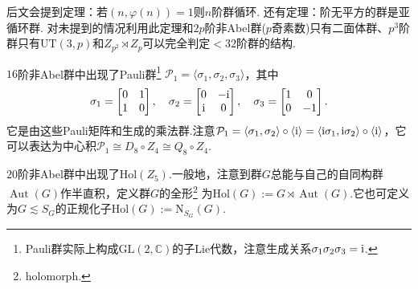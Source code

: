 \begin{remark}
	后文会提到定理：若$(n,\varphi(n))=1$则$n$阶群循环.%
	还有定理：阶无平方的群是亚循环群.%
	对未提到的情况利用此定理和$2p$阶非Abel群($p$奇素数)只有二面体群、$p^3$阶群只有$\mathrm{UT}(3,p)$和$Z_{p^2}\rtimes Z_p$可以完全判定$<32$阶群的结构.
\end{remark}
\begin{remark}
	$16$阶非Abel群中出现了{\heiti Pauli群}\footnote{Pauli群实际上构成$\mathrm{GL}(2,\mathbb{C})$的子Lie代数，注意生成关系$\sigma_1\sigma_2\sigma_3=\mathrm{i}$.} $\mathcal{P}_1=\langle \sigma_1,\sigma_2,\sigma_3\rangle $，其中
	\[
		\sigma_1=\begin{bmatrix}
			0&1\\
			1&0
		\end{bmatrix},\quad\sigma_2=\begin{bmatrix}
			0&-\mathrm{i}\\
			\mathrm{i}&0
		\end{bmatrix},\quad\sigma_3=\begin{bmatrix}
			1&0\\
			0&-1
		\end{bmatrix}.
	\]
	它是由这些Pauli矩阵和生成的乘法群.注意$\mathcal{P}_1=\langle \sigma_1,\sigma_2\rangle \circ\langle \mathrm{i}\rangle=\langle \mathrm{i}\sigma_1,\mathrm{i}\sigma_2\rangle \circ\langle \mathrm{i}\rangle  $，它可以表达为中心积$\mathcal{P}_1\cong D_8\circ Z_4\cong Q_8\circ Z_4$.
\end{remark}
\begin{remark}
	$20$阶非Abel群中出现了$\mathrm{Hol}(Z_5)$.一般地，注意到群$G$总能与自己的自同构群$\operatorname*{Aut}(G)$作半直积，定义群$G$的{\heiti 全形}\footnote{holomorph.} 为$\mathrm{Hol}(G):=G\rtimes\operatorname*{Aut}(G)$.它也可定义为$G\lesssim S_G$的正规化子$\mathrm{Hol}(G):=\mathrm{N}_{S_G}(G)$.
\end{remark}

